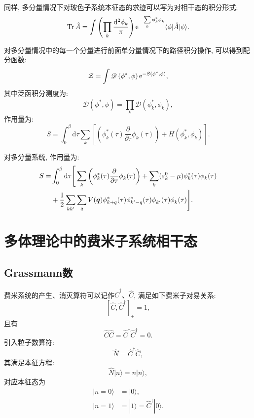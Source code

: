 同样, 多分量情况下对玻色子系统本征态的求迹可以写为对相干态的积分形式:
\begin{equation}
\operatorname{Tr} \hat{A}=\int\left(\prod_{k} \frac{\mathrm{d}^{2} \phi_{k}}{\pi}\right) \mathrm{e}^{-\sum\limits_{k} \phi^*_{k} \phi^{}_{k}}\langle\phi|\hat{A}| \phi\rangle.
\end{equation}

对多分量情况中的每一个分量进行前面单分量情况下的路径积分操作, 可以得到配分函数:
\begin{equation}
\mathcal{Z}=\int\mathscr{D}\left(\phi^{*}, \phi\right) \mathrm{e}^{-S\left(\phi^{*}, \phi\right)},
\end{equation}
其中泛函积分测度为:
\begin{equation}
\mathscr{D}\left(\phi^{*}, \phi\right)=\prod_{k}\mathscr{D}\left(\phi_{k}^{*}, \phi^{}_{k}\right),
\end{equation}
作用量为:
\begin{equation}
S=\int_{0}^{\beta} \mathrm{d} \tau\sum_{k}\left[\left(\phi_{k}^{*}(\tau) \frac{\partial}{\partial \tau} \phi^{}_{k}(\tau)\right)+H\left(\phi_{k}^{*}, \phi^{}_k\right)\right].
\end{equation}

\begin{example}对多分量系统, 作用量为:
\begin{align}
S=&\int_{0}^{\beta} \mathrm{d} \tau\Bigg[\sum_{k}\left(\phi_{k}^{*}(\tau) \frac{\partial}{\partial \tau} \phi^{}_{k}(\tau)\right)+\sum_k(\varepsilon_k^0-\mu) {\phi}_k^{*}(\tau) {\phi}^{}_k(\tau)\nonumber\\
 &+ \frac{1}{2}\sum_{kk^\prime}\sum_{q}V(\boldsymbol{q}){\phi}^{*}_{k+q}(\tau){\phi}^{*}_{k^\prime-q}(\tau){\phi}^{}_{k^\prime}(\tau){\phi}^{}_{k}(\tau)\Bigg].
\end{align}
\end{example}

\section{多体理论中的费米子系统相干态}
\subsection{Grassmann数}
费米系统的产生、消灭算符可以记作$\hat{C}^\dagger$、$\hat C$, 满足如下费米子对易关系:
\begin{equation}
\left[\hat{C}, \hat{C}^{\dagger}\right]_{+}=1,
\end{equation}
且有
\begin{equation}
\hat C \hat C=\hat{C}^{\dagger}\hat{C}^{\dagger}=0.
\end{equation}
引入粒子数算符:
\begin{equation}
\hat{N}=\hat{C}^{\dagger} \hat{C},
\end{equation}
其满足本征方程:
\begin{equation}
\hat{N}|n\rangle=n|n\rangle,
\end{equation}
对应本征态为
\begin{align}
|n=0\rangle&=|0\rangle,\nonumber\\
|n=1\rangle&=|1\rangle=\hat C^{\dagger}|0\rangle.
\end{align}

